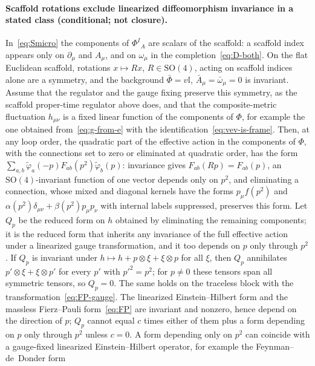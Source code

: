 \paragraph{Scaffold rotations exclude linearized diffeomorphism invariance in a stated class (conditional; not closure).}
In~\eqref{eq:Smicro} the components of \(\Phi^I{}_A\) are scalars of
the scaffold: a scaffold index appears only on \(\partial_\mu\) and
\(A_\mu\), and on \(\omega_\mu\) in the completion~\eqref{eq:D-both}.
On the flat Euclidean scaffold, rotations \(x\mapsto Rx\),
\(R\in\mathrm{SO}(4)\), acting on scaffold indices alone are a
symmetry, and the background \(\bar\Phi=v\mathbb I\),
\(\bar A_\mu=\bar\omega_\mu=0\) is invariant. Assume that the regulator
and the gauge fixing preserve this symmetry, as the scaffold
proper-time regulator above does, and that the composite-metric
fluctuation \(h_{\mu\nu}\) is a fixed linear function of the components
of \(\Phi\), for example the one obtained from~\eqref{eq:g-from-e}
with the identification~\eqref{eq:vev-is-frame}. Then, at any loop
order, the quadratic part of the effective action in the components of
\(\Phi\), with the connections set to zero or eliminated at quadratic
order, has the form
\(\sum_{a,b}\tilde\varphi_a(-p)F_{ab}(p^2)\tilde\varphi_b(p)\):
invariance gives \(F_{ab}(Rp)=F_{ab}(p)\), an
\(\mathrm{SO}(4)\)-invariant function of one vector depends only on
\(p^2\), and eliminating a connection, whose mixed and diagonal kernels
have the forms \(p_\mu f(p^2)\) and
\(\alpha(p^2)\delta_{\mu\nu}+\beta(p^2)p_\mu p_\nu\) with internal
labels suppressed, preserves this form. Let \(Q_p\) be the reduced form
on \(h\) obtained by eliminating the remaining components; it is the
reduced form that inherits any invariance of the full effective action
under a linearized gauge transformation, and it too depends on \(p\)
only through \(p^2\). If \(Q_p\) is invariant under
\(h\mapsto h+p\otimes\xi+\xi\otimes p\) for all \(\xi\), then \(Q_p\)
annihilates \(p'\otimes\xi+\xi\otimes p'\) for every \(p'\) with
\(p'^2=p^2\); for \(p\neq0\) these tensors span all symmetric tensors,
so \(Q_p=0\). The same holds on the traceless block with the
transformation~\eqref{eq:FP-gauge}. The linearized Einstein--Hilbert
form and the massless Fierz--Pauli form~\eqref{eq:FP} are invariant
and nonzero, hence depend on the direction of \(p\); \(Q_p\) cannot
equal \(c\) times either of them plus a form depending on \(p\) only
through \(p^2\) unless \(c=0\). A form depending only on \(p^2\) can
coincide with a gauge-fixed linearized Einstein--Hilbert operator, for
example the Feynman--de~Donder form
